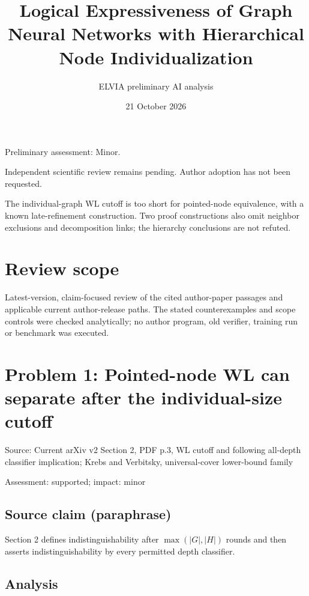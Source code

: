 \documentclass[11pt]{article}
\begin{document}
\title{Logical Expressiveness of Graph Neural Networks with Hierarchical Node Individualization}

\author{ELVIA preliminary AI analysis}\date{21 October 2026}\maketitle

Preliminary assessment: Minor.\par

Independent scientific review remains pending. Author adoption has not been requested.

The individual-graph WL cutoff is too short for pointed-node equivalence, with a known late-refinement construction. Two proof constructions also omit neighbor exclusions and decomposition links; the hierarchy conclusions are not refuted.

\section*{Review scope}

Latest-version, claim-focused review of the cited author-paper passages and applicable current author-release paths. The stated counterexamples and scope controls were checked analytically; no author program, old verifier, training run or benchmark was executed.

\section*{Problem 1: Pointed-node WL can separate after the individual-size cutoff}

Source: Current arXiv v2 Section 2, PDF p.3, WL cutoff and following all-depth classifier implication; Krebs and Verbitsky, universal-cover lower-bound family

Assessment: supported; impact: minor

\subsection*{Source claim (paraphrase)}

Section 2 defines indistinguishability after \(\max(|G|,|H|)\) rounds and then asserts indistinguishability by every permitted depth classifier.

\subsection*{Analysis}
\end{document}
